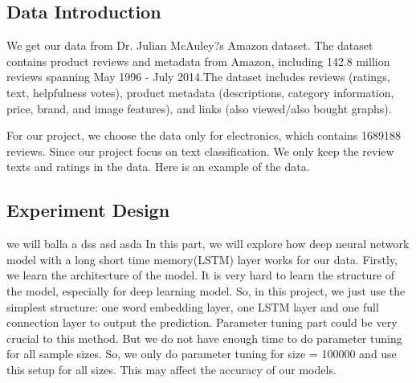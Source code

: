 \documentclass[letterpaper]{article} %
\begin{document}
\subsection{Data Introduction}
We get our data from Dr. Julian McAuley?s Amazon dataset. The dataset contains product reviews and metadata from Amazon, including 142.8 million reviews spanning May 1996 - July 2014.The dataset includes reviews (ratings, text, helpfulness votes), product metadata (descriptions, category information, price, brand, and image features), and links (also viewed/also bought graphs). \par
For our project, we choose the data only for electronics, which contains 1689188 reviews. Since our project focus on text classification. We only keep the review texts and ratings in the data. Here is an example of the data.\par
\begin{table}[htb]
\caption{Example of Amazon Review Data} %
\end{table}

\subsection{Experiment Design}

we will balla a dss asd asda
In this part, we will explore how deep neural network model with a long short time memory(LSTM) layer works for our data. 
Firstly, we learn the architecture of the model. It is very hard to learn the structure of the model, especially for deep learning model. So, in this project, we just use the simplest structure: one word embedding layer, one LSTM layer and one full connection layer to output the prediction. 
Parameter tuning part could be very crucial to this method. But we do not have enough time to do parameter tuning for all sample sizes. So, we only do parameter tuning for size = 100000 and use this setup for all sizes. This may affect the accuracy of our models.
\end{document}
